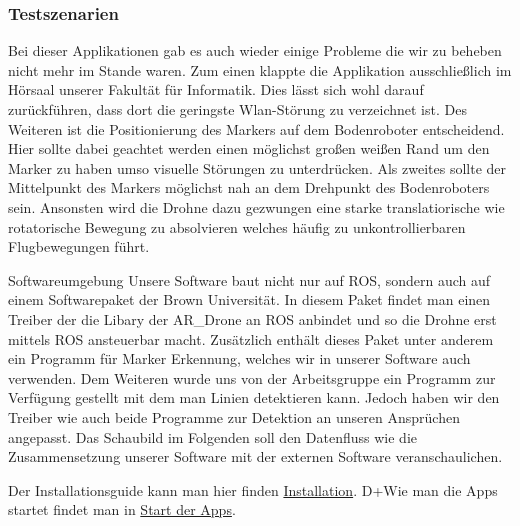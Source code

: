 \subsubsection*{Testszenarien }

Bei dieser Applikationen gab es auch wieder einige Probleme die wir zu beheben nicht mehr im Stande waren. Zum einen klappte die Applikation ausschließlich im Hörsaal unserer Fakultät für Informatik. Dies lässt sich wohl darauf zurückführen, dass dort die geringste Wlan-\/Störung zu verzeichnet ist. Des Weiteren ist die Positionierung des Markers auf dem Bodenroboter entscheidend. Hier sollte dabei geachtet werden einen möglichst großen weißen Rand um den Marker zu haben umso visuelle Störungen zu unterdrücken. Als zweites sollte der Mittelpunkt des Markers möglichst nah an dem Drehpunkt des Bodenroboters sein. Ansonsten wird die Drohne dazu gezwungen eine starke translatiorische wie rotatorische Bewegung zu absolvieren welches häufig zu unkontrollierbaren Flugbewegungen führt.

Softwareumgebung Unsere Software baut nicht nur auf ROS, sondern auch auf einem Softwarepaket der Brown Universität. In diesem Paket findet man einen Treiber der die Libary der AR\_\-Drone an ROS anbindet und so die Drohne erst mittels ROS ansteuerbar macht. Zusätzlich enthält dieses Paket unter anderem ein Programm für Marker Erkennung, welches wir in unserer Software auch verwenden. Dem Weiteren wurde uns von der Arbeitsgruppe ein Programm zur Verfügung gestellt mit dem man Linien detektieren kann. Jedoch haben wir den Treiber wie auch beide Programme zur Detektion an unseren Ansprüchen angepasst. Das Schaubild im Folgenden soll den Datenfluss wie die Zusammensetzung unserer Software mit der externen Software veranschaulichen.

Der Installationsguide kann man hier finden \hyperlink{page1}{Installation}. D+Wie man die Apps startet findet man in \hyperlink{page2}{Start der Apps}. 